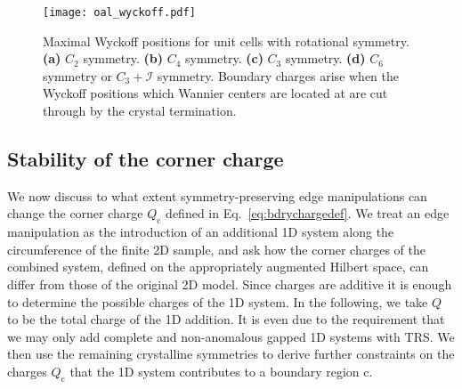 \begin{figure}[H]
\centering
\texttt{[image: oal\_wyckoff.pdf]}
\caption[Maximal Wyckoff positions for unit cells with rotational symmetry]{Maximal Wyckoff positions for unit cells with rotational symmetry. \textbf{(a)} $C_2$ symmetry. \textbf{(b)} $C_4$ symmetry. \textbf{(c)} $C_3$ symmetry. \textbf{(d)} $C_6$ symmetry or $C_3 + \mathcal{I}$ symmetry. Boundary charges arise when the Wyckoff positions which Wannier centers are located at are cut through by the crystal termination.}
\label{fig:wyckpositions}
\end{figure}

\subsection{Stability of the corner charge}
\label{sec:bdrychargerobustness}
We now discuss to what extent symmetry-preserving edge manipulations can change the corner charge $Q_\mathrm{c}$ defined in Eq.~\eqref{eq:bdrychargedef}. We treat an edge manipulation as the introduction of an additional 1D system along the circumference of the finite 2D sample, and ask how the corner charges of the combined system, defined on the appropriately augmented Hilbert space, can differ from those of the original 2D model. Since charges are additive it is enough to determine the possible charges of the 1D system. In the following, we take $Q$ to be the total charge of the 1D addition. It is even due to the requirement that we may only add complete and non-anomalous gapped 1D systems with TRS. We then use the remaining crystalline symmetries to derive further constraints on the charges $Q_{\mathrm{c}}$ that the 1D system contributes to a boundary region $\mathrm{c}$.

